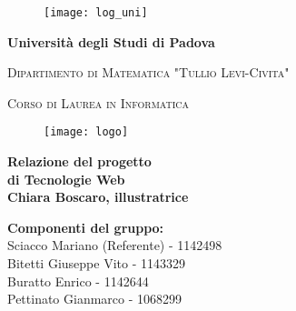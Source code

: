 
\begin{titlepage}

\begin{figure}[htbp]
\flushright
\texttt{[image: log\_uni]}
\end{figure}

\begin{center}

\begin{LARGE}
\textbf{Università degli Studi di Padova}\\
\end{LARGE}


\vspace{8pt}

\begin{Large}
\textsc{Dipartimento di Matematica "Tullio Levi-Civita"}\\
\end{Large}

\vspace{8pt}

\begin{large}
\textsc{Corso di Laurea in Informatica}\\
\end{large}

\vspace{25pt}
\begin{figure}[htbp]
\begin{center}
\texttt{[image: logo]}
\end{center}
\end{figure}
\vspace{20pt} 

\begin{LARGE}
\begin{center}
\textbf{Relazione del progetto \\ di Tecnologie Web \\ Chiara Boscaro, illustratrice} \\
\end{center}
\end{LARGE}

\vspace{30pt} %

\begin{large}
\textbf{Componenti del gruppo:} \\
\vspace{1pt}
Sciacco Mariano (Referente) - 1142498 \\ Bitetti Giuseppe Vito - 1143329\\ Buratto Enrico - 1142644\\ Pettinato Gianmarco - 1068299
\vspace{5pt}


\end{large}
\end{center}
\end{titlepage}
